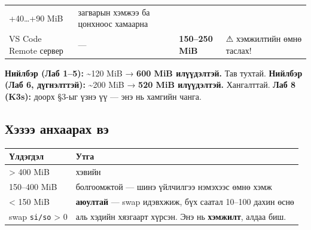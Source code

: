 \begin{longtable}[]{@{}llll@{}}
\begin{minipage}[t]{0.22\columnwidth}
+40\ldots+90 MiB\strut
\end{minipage} & \begin{minipage}[t]{0.22\columnwidth}\raggedright
загварын хэмжээ ба цонхноос хамаарна\strut
\end{minipage}\tabularnewline
\begin{minipage}[t]{0.22\columnwidth}\raggedright
VS Code Remote сервер\strut
\end{minipage} & \begin{minipage}[t]{0.22\columnwidth}\raggedright
---\strut
\end{minipage} & \begin{minipage}[t]{0.22\columnwidth}\raggedright
\textbf{150--250 MiB}\strut
\end{minipage} & \begin{minipage}[t]{0.22\columnwidth}\raggedright
⚠ хэмжилтийн өмнө таслах!\strut
\end{minipage}\tabularnewline
\bottomrule
\end{longtable}\endgroup

\textbf{Нийлбэр (Лаб 1--5):} \textasciitilde120 MiB → \textbf{600 MiB илүүдэлтэй.} Тав тухтай.
\textbf{Нийлбэр (Лаб 6, дүгнэлттэй):} \textasciitilde200 MiB → \textbf{520 MiB илүүдэлтэй.} Хангалттай.
\textbf{Лаб 8 (K3s):} доорх §3-ыг үзнэ үү --- энэ нь хамгийн чанга.

\hypertarget{ux445ux44dux437ux44dux44d-ux430ux43dux445ux430ux430ux440ux430ux445-ux432ux44d}{%
\subsection{Хэзээ анхаарах вэ}\label{ux445ux44dux437ux44dux44d-ux430ux43dux445ux430ux430ux440ux430ux445-ux432ux44d}}

\begin{Shaded}
\begin{Highlighting}[]
\KeywordTok{|}  
\end{Highlighting}
\end{Shaded}

\begingroup\scriptsize\begin{longtable}[]{@{}ll@{}}
\toprule
Үлдэгдэл & Утга\tabularnewline
\midrule
\endhead
\textgreater{} 400 MiB & хэвийн\tabularnewline
150--400 MiB & болгоомжтой --- шинэ үйлчилгээ нэмэхээс өмнө хэмж\tabularnewline
\textless{} 150 MiB & \textbf{аюултай} --- swap идэвхжиж, бүх саатал 10--100 дахин өснө\tabularnewline
swap \texttt{si/so} \textgreater{} 0 & аль хэдийн хязгаарт хүрсэн. Энэ нь \textbf{хэмжилт}, алдаа биш.\tabularnewline
\bottomrule
\end{longtable}\endgroup

